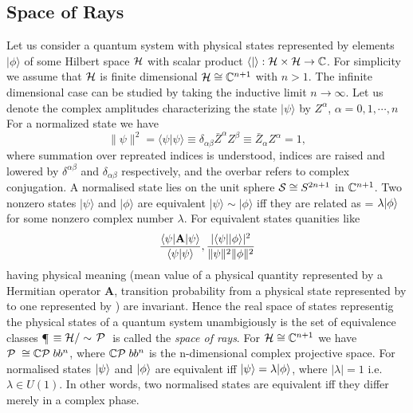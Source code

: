 \subsection{Space of Rays}
Let us consider a quantum system with physical states represented by elements $|\phi\rangle$
of some Hilbert space $\H$ with scalar product $\langle | \rangle: \H \times \H \to \Cbb$.
For simplicity we assume that $\H$ is finite dimensional $\H \iso \Cbb^{n+1}$ with $n \gt 1$.
The infinite dimensional case can be studied by taking the inductive limit $n \to \infty$. Let us denote the complex
amplitudes characterizing the state $| \psi \rangle$ by $Z^{\alpha}$, $\alpha = 0,1,\cdots, n$
For a normalized state we have 
\begin{equation}\label{a}
 \|\psi\|^{2} = \langle \psi | \psi \rangle \equiv \delta_{\alpha \beta} \bar{Z}^{\alpha} Z^{\beta} \equiv
\bar{Z}_{\alpha} Z^{\alpha} = 1,
\end{equation}
where summation over repreated indices is understood, indices are raised and lowered by $\delta^{\alpha \beta}$ and
$\delta_{\alpha \beta}$ respectively, and the overbar refers to complex conjugation. 
 A normalised state lies on the unit sphere $\S \iso S^{2n+1}$ in $\Cbb^{n+1}$. Two nonzero states $|\psi\rangle$ 
and $|\phi\rangle$ are equivalent $| \psi \rangle \sim |\phi \rangle$ iff they are related as \psiket = $\lambda \phiket$
for some nonzero complex number $\lambda$. For equivalent states quanities like 
\begin{equation}\label{b}
 \dfrac{\psibra \mathbf{A} \psiket}{\psibra \psi \rangle}, \dfrac{|\psibra \phiket|^{2}}{\|\psi\|^{2}\|\phi\|^{2}}
\end{equation}
having physical meaning (mean value of a physical quantity represented by a Hermitian operator $\mathbf{A}$, transition
probability from a physical state represented by \psiket to one represented by \phiket) are invariant. 
Hence the real space of states representig the physical states of a quantum system unambigiously is the set of 
equivalence classes \P\; \;$\equiv \H / \sim$ $\P\;$ is called the \textit{space of rays}.
For $\H \iso \Cbb^{n+1}$ we have $\P\; \iso \Cbb \P\;bb^{n}$, where $\Cbb \P\;bb^{n}$ is the n-dimensional complex projective
space. For normalised states $\psiket$ and $\phiket$ are equivalent iff $\psiket = \lambda \phiket$, 
where $|\lambda|=1$ i.e. $\lambda \in U(1)$. In other words, two normalised states are equivalent iff they differ
merely in a complex phase. 
